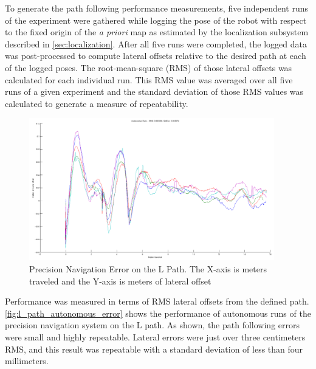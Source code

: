 To generate the path following performance measurements, five independent runs of the experiment were gathered while logging the pose of the robot with respect to the fixed origin of the \emph{a priori} map as estimated by the localization subsystem described in \autoref{sec:localization}. After all five runs were completed, the logged data was post-processed to compute lateral offsets relative to the desired path at each of the logged poses. The root-mean-square (RMS) of those lateral offsets was calculated for each individual run. This RMS value was averaged over all five runs of a given experiment and the standard deviation of those RMS values was calculated to generate a measure of repeatability.

\begin{figure}
\centering
\includegraphics[width=0.95\textwidth]{images/l_path_autonomous_error}
\caption[Precision Navigation Error on the L Path]{Precision Navigation Error on the L Path. The X-axis is meters traveled and the Y-axis is meters of lateral offset}
\label{fig:l_path_autonomous_error}
\end{figure}

Performance was measured in terms of RMS lateral offsets from the defined path. \autoref{fig:l_path_autonomous_error} shows the performance of autonomous runs of the precision navigation system on the L path. As shown, the path following errors were small and highly repeatable. Lateral errors were just over three centimeters RMS, and this result was repeatable with a standard deviation of less than four millimeters.

